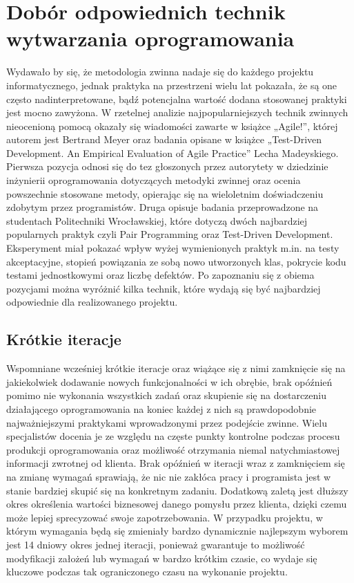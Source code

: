 \section{Dobór odpowiednich technik wytwarzania oprogramowania}
\label{sec:doborTechnikWytwarzania}

Wydawało by się, że metodologia zwinna nadaje się do każdego projektu
informatycznego, jednak praktyka na przestrzeni wielu lat pokazała, że są one często
nadinterpretowane, bądź potencjalna wartość dodana stosowanej praktyki jest mocno
zawyżona. W rzetelnej analizie najpopularniejszych technik zwinnych nieocenioną pomocą
okazały się wiadomości zawarte w książce „Agile!”, której autorem jest Bertrand Meyer oraz
badania opisane w książce „Test-Driven Development. An Empirical Evaluation of Agile
Practice” Lecha Madeyskiego. Pierwsza pozycja odnosi się do tez głoszonych przez
autorytety w dziedzinie inżynierii oprogramowania dotyczących metodyki zwinnej oraz ocenia powszechnie stosowane
metody, opierając się na wieloletnim doświadczeniu zdobytym przez programistów. Druga
opisuje badania przeprowadzone na studentach Politechniki Wrocławskiej, które dotyczą
dwóch najbardziej popularnych praktyk czyli Pair Programming oraz Test-Driven
Development. Eksperyment miał pokazać wpływ wyżej wymienionych praktyk m.in. na testy
akceptacyjne, stopień powiązania ze sobą nowo utworzonych klas, pokrycie kodu testami
jednostkowymi oraz liczbę defektów. Po zapoznaniu się z obiema pozycjami można wyróżnić
kilka technik, które wydają się być najbardziej odpowiednie dla realizowanego projektu.

\subsection{Krótkie iteracje}
\label{subsec:krótkieIteracje}

Wspomniane wcześniej krótkie iteracje oraz wiążące się z nimi zamknięcie się na
jakiekolwiek dodawanie nowych funkcjonalności w ich obrębie, brak opóźnień pomimo nie
wykonania wszystkich zadań oraz skupienie się na dostarczeniu działającego oprogramowania na koniec każdej z nich są prawdopodobnie najważniejszymi praktykami
wprowadzonymi przez podejście zwinne. Wielu specjalistów docenia je ze względu na
częste punkty kontrolne podczas procesu produkcji oprogramowania oraz możliwość
otrzymania niemal natychmiastowej informacji zwrotnej od klienta. Brak opóźnień w iteracji
wraz z zamknięciem się na zmianę wymagań sprawiają, że nic nie zakłóca pracy i programista
jest w stanie bardziej skupić się na konkretnym zadaniu. Dodatkową zaletą jest dłuższy okres
określenia wartości biznesowej danego pomysłu przez klienta, dzięki czemu może
lepiej sprecyzować swoje zapotrzebowania. W przypadku projektu, w którym wymagania będą
się zmieniały bardzo dynamicznie najlepszym wyborem jest 14 dniowy okres jednej iteracji,
ponieważ gwarantuje to możliwość modyfikacji założeń lub wymagań w bardzo krótkim
czasie, co wydaje się kluczowe podczas tak ograniczonego czasu na wykonanie projektu.

